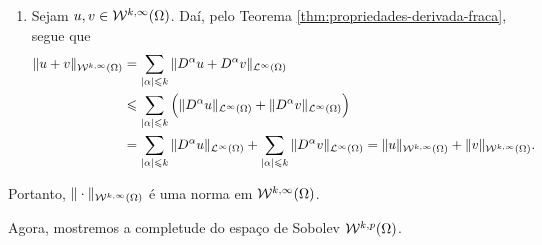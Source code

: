 \begin{prf}
\begin{enumerate}[leftmargin=*]
        \item Sejam $u, v \in \mathcal{W}^{k,\infty}(\Omega)$. Daí, pelo Teorema \ref{thm:propriedades-derivada-fraca}, segue que
        \[
            \begin{aligned}
                \Vert u + v \Vert_{\mathcal{W}^{k,\infty}(\Omega)} &= \sum_{|\alpha| \leqslant k} \Vert D^\alpha u + D^\alpha v \Vert_{\mathcal{L}^\infty(\Omega)}\\ &\leqslant \sum_{|\alpha| \leqslant k} \Big( \Vert D^\alpha u \Vert_{\mathcal{L}^\infty(\Omega)} + \Vert D^\alpha v \Vert_{\mathcal{L}^\infty(\Omega)} \Big)\\
                &= \sum_{|\alpha| \leqslant k} \Vert D^\alpha u \Vert_{\mathcal{L}^\infty(\Omega)} + \sum_{|\alpha| \leqslant k}\Vert D^\alpha v \Vert_{\mathcal{L}^\infty(\Omega)} = \Vert u \Vert_{\mathcal{W}^{k,\infty}(\Omega)} + \Vert v \Vert_{\mathcal{W}^{k,\infty}(\Omega)}.
            \end{aligned}
        \]
    \end{enumerate}
    Portanto, $\Vert \cdot \Vert_{\mathcal{W}^{k,\infty}(\Omega)}$ é uma norma em $\mathcal{W}^{k,\infty}(\Omega)$.
\end{prf}

Agora, mostremos a completude do espaço de Sobolev $\mathcal{W}^{k,p}(\Omega)$.

